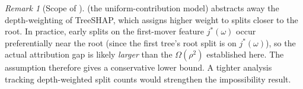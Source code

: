 \documentclass[11pt]{article}
\theoremstyle{remark}
\newtheorem{remark}[theorem]{Remark}
\newcommand{\rhovar}{\rho}                  %
\begin{document}
\begin{remark}[Scope of ]
\label{rem:assumption-scope}
 (the uniform-contribution model) abstracts away the
depth-weighting of TreeSHAP, which assigns higher weight to splits closer
to the root.  In practice, early splits on the first-mover feature
$j^*(\omega)$ occur preferentially near the root (since the first tree's
root split is on $j^*(\omega)$), so the actual attribution gap is likely
\emph{larger} than the $\Omega(\rhovar^2)$ established here.  The
assumption therefore gives a conservative lower bound.  A tighter analysis
tracking depth-weighted split counts would strengthen the impossibility
result.
\end{remark}
\end{document}
